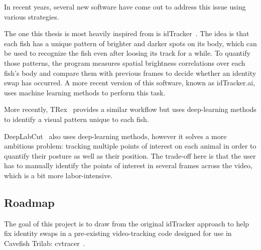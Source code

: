 \documentclass{article}
\newcommand{\yf}[1]{{\color{darkRed}{#1}}}
\begin{document}
In recent years, several new software have come out to address this issue using various strategies.

The one this thesis is most heavily inspired from is idTracker~\cite{perez-escudero_idtracker_2014}. The idea is that each fish has a unique pattern of brighter and darker spots on its body, which can be used to recognize the fish even after loosing its track for a while. To quantify those patterns, the program measures spatial brightness correlations over each fish's body and compare them with previous frames to decide whether an identity swap has occurred. A more recent version of this software, known as idTracker.ai, uses machine learning methods to perform this task.

More recently, TRex~\cite{walter_trex_2021} provides a similar workflow but uses deep-learning methods to identify a visual pattern unique to each fish.

DeepLabCut~\cite{mathis_deeplabcut_2018} also uses deep-learning methods, however it solves a more ambitious problem: tracking multiple points of interest on each animal in order to quantify their posture as well as their position. The trade-off here is that the user has to manually identify the points of interest in several frames across the video, which is a bit more labor-intensive.


\subsection{Roadmap}

The goal of this project is to draw from the original idTracker approach to help fix identity swaps in a pre-existing video-tracking code designed for use in Cavefish Trilab: cvtracer~\cite{patch_kinematic_2020, patch_patchmemorycvtracer_2020}.

\yf{[Give a brief overview what's covered in each section of the thesis]}




\end{document}
